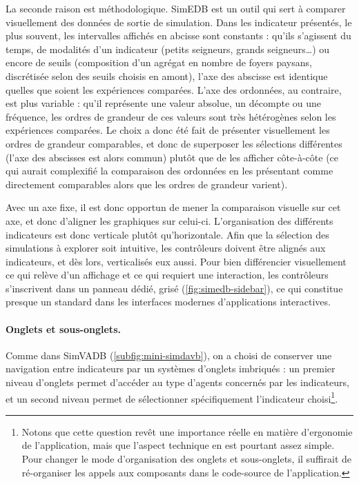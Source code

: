 La seconde raison est méthodologique.
SimEDB est un outil qui sert à comparer visuellement des données de sortie de simulation.
Dans les indicateur présentés, le plus souvent, les intervalles affichés en abcisse sont constants : qu'ils s'agissent du temps, de modalités d'un indicateur (petits seigneurs, grands seigneurs\ldots) ou encore de seuils (composition d'un agrégat en nombre de foyers paysans, discrétisée selon des seuils choisis en amont), l'axe des abscisse est identique quelles que soient les expériences comparées.
L'axe des ordonnées, au contraire, est plus variable : qu'il représente une valeur absolue, un décompte ou une fréquence, les ordres de grandeur de ces valeurs sont très hétérogènes selon les expériences comparées.
Le choix a donc été fait de présenter visuellement les ordres de grandeur comparables, et donc de superposer les sélections différentes (l'axe des abscisses est alors commun) plutôt que de les afficher côte-à-côte (ce qui aurait complexifié la comparaison des ordonnées en les présentant comme directement comparables alors que les ordres de grandeur varient).


Avec un axe \og fixe\fg{}, il est donc opportun de mener la comparaison visuelle sur cet axe, et donc d'aligner les graphiques sur celui-ci. L'organisation des différents indicateurs est donc verticale plutôt qu'horizontale.
Afin que la sélection des simulations à explorer soit intuitive, les contrôleurs doivent être alignés aux indicateurs, et dès lors, verticalisés eux aussi.
Pour bien différencier visuellement ce qui relève d'un affichage et ce qui requiert une interaction, les contrôleurs s'inscrivent dans un panneau dédié, grisé (\cref{fig:simedb-sidebar}), ce qui constitue presque un standard dans les interfaces modernes d'applications interactives.

\paragraph{Onglets et sous-onglets.}

Comme dans SimVADB (\cref{subfig:mini-simdavb}), on a choisi de conserver une navigation entre indicateurs par un systèmes d'onglets imbriqués : un premier niveau d'onglets permet d'accéder au type d'agents concernés par les indicateurs, et un second niveau permet de sélectionner spécifiquement l'indicateur choisi\footnote{
	Notons que cette question revêt une importance réelle en matière d'ergonomie de l'application, mais que l'aspect technique en est pourtant assez simple.
	Pour changer le mode d'organisation des onglets et sous-onglets, il suffirait de ré-organiser les appels aux composants dans le code-source de l'application.
}.

